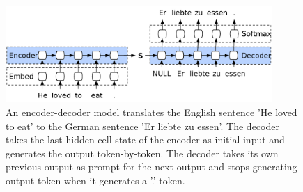 \begin{figure}
	\centering\includegraphics[width=0.9\textwidth]{../visualizations/ch4-methods/enc_dec.pdf} 
	\caption[bla.]{An encoder-decoder model \cite{ruderencdecgraphic} translates the English sentence 'He loved to eat' to the German sentence 'Er liebte zu essen'. The decoder takes the last hidden cell state of the encoder as initial input and generates the output token-by-token. The decoder takes its own previous output as prompt for the next output and stops generating output token when it generates a '.'-token. }
	\label{fig:encdec}
\end{figure}

